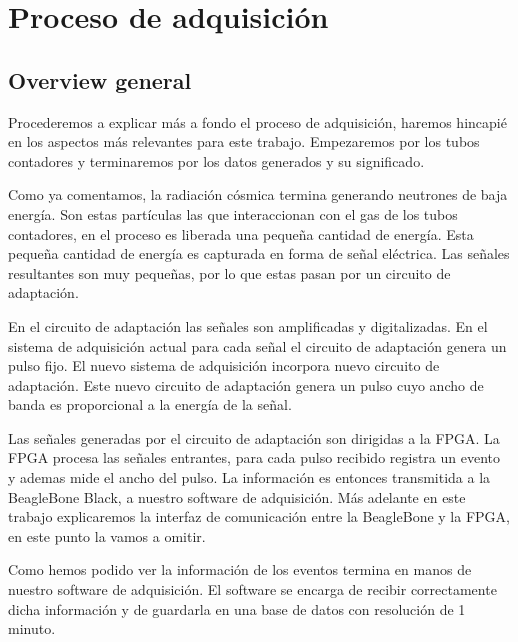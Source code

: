 \section{Proceso de adquisición}
	\subsection{Overview general}
		Procederemos a explicar más a fondo el proceso de adquisición, haremos hincapié en los aspectos más relevantes para este trabajo. Empezaremos
		por los tubos contadores y terminaremos por los datos generados y su significado.
		\par
		Como ya comentamos, la radiación cósmica termina generando neutrones de baja energía. Son estas partículas las que interaccionan con el gas de
		los tubos contadores, en el proceso es liberada una pequeña cantidad de energía. Esta pequeña cantidad de energía es capturada en forma de
		señal eléctrica. Las señales resultantes son muy pequeñas, por lo que estas pasan por un circuito de adaptación. 
		\par
		En el circuito de adaptación las señales son amplificadas y digitalizadas. En el sistema de adquisición actual para cada señal el circuito
		de adaptación genera un pulso fijo. El nuevo sistema de adquisición incorpora nuevo circuito de adaptación. Este nuevo circuito de
		adaptación genera un pulso cuyo ancho de banda es proporcional a la energía de la señal. 
		\par
		Las señales generadas por el circuito de adaptación son dirigidas a la FPGA. La FPGA procesa las señales entrantes, para cada pulso recibido
		registra un evento y ademas mide el ancho del pulso. La información es entonces transmitida a la BeagleBone Black, a nuestro software de
		adquisición. Más adelante en este trabajo explicaremos la interfaz de comunicación entre la BeagleBone y la FPGA, en este punto la vamos a omitir. 
		\par
		Como hemos podido ver la información de los eventos termina en manos de nuestro software de adquisición. El software se encarga de recibir
		correctamente dicha información y de guardarla en una base de datos con resolución de 1 minuto.

